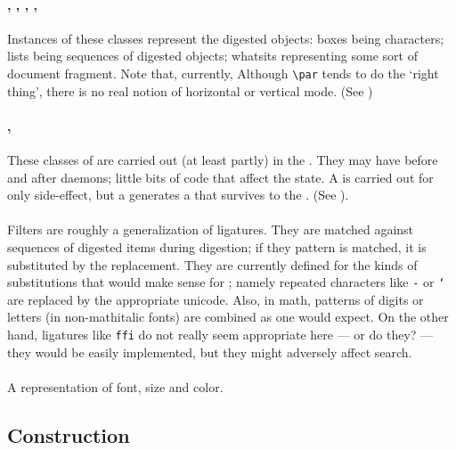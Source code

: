 \documentclass{article}
\begin{document}
\paragraph{, , , , } Instances of
these classes represent the digested objects: boxes being characters; lists being sequences
of digested objects; whatsits representing some sort of document fragment.
Note that, currently, Although \verb|\par| tends to do the `right thing', there 
is no real notion of horizontal or vertical mode.
(See )

\paragraph{,} These classes of  are carried out
(at least partly) in the . They may have before and after daemons; little bits
of code that affect the state.  A  is carried out for only side-effect,
but a  generates a  that survives to the .
(See ).


\paragraph{} Filters are roughly a generalization of ligatures. They are matched
against sequences of digested items during digestion; if they pattern is matched, it is substituted
by the replacement.  They are currently defined for the kinds of substitutions that would
make sense for \XML; namely repeated characters like \texttt{-} or \texttt{`} are replaced by 
the appropriate unicode. Also, in math, patterns of digits or letters (in non-mathitalic fonts) 
are combined as one would expect.  On the other hand, ligatures like \texttt{ffi} do not
really seem appropriate here --- or do they? --- they would be easily implemented, but
they might adversely affect search.

\paragraph{} A representation of font, size and color.

\subsection{Construction}
\end{document}
